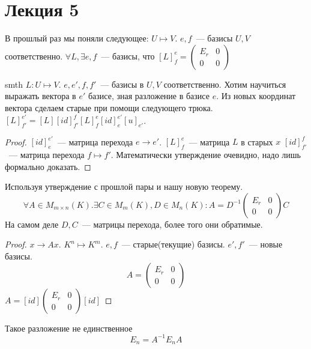 \section{Лекция 5}
В прошлый раз мы поняли следующее:
$U\mapsto V$.
$e,f$~--- базисы $U, V$ соответственно.
$\forall L, \exists e,f$~--- базисы,
что $[L]_f^e=
\begin{pmatrix}
    E_r & 0\\
    0 & 0
\end{pmatrix}$

\begin{theorem}{ smth }
    $L: U\mapsto V$. 
    $e, e', f, f'$~--- базисы в $U, V$ соответственно.
    Хотим научиться выражать вектора в $e'$ базисе, зная разложение
    в базисе $e$.
    Из новых координат вектора сделаем старые при помощи следующего трюка.
    $[L]^{e'}_{f'}=[L][id]_{f'}^{f}[L]_f^{e}[id]_e^{e'}[u]_{e'}$.
\end{theorem}
\begin{proof}
    $[id]_{e}^{e'}$~--- матрица перехода $e\rightarrow e'$.
    $[L]_f^e$~--- матрица $L$ в старых $x$
    $[id]_{f'}^f$~--- матрица перехода $f\mapsto f'$.
    Математически утверждение очевидно, надо лишь формально доказать.
\end{proof}
\begin{follow}
    Используя утверждение с прошлой пары и нашу новую теорему.
    $$\forall A\in M_{m\times n}(K).
    \exists C\in M_m(K), D\in M_n(K): A = D^{-1}
    \begin{pmatrix}
        E_r & 0\\
        0 & 0
    \end{pmatrix}C$$
    На самом деле $D, C$~--- матрицы перехода, более того они
    обратимые.
\end{follow}
\begin{proof}
    $x\rightarrow Ax$.
    $K^n\mapsto K^m$.
    $e, f$~--- старые(текущие) базисы.
    $e', f'$~--- новые базисы.
    $$A = \begin{pmatrix}
         E_r & 0\\
         0 & 0
        \end{pmatrix}
    $$
    $A = [id]\begin{pmatrix}
        E_r & 0\\
        0 & 0
    \end{pmatrix}[id]$
\end{proof}
\begin{remark}
    Такое разложение не единственное
    $$
    E_n = A^{-1}E_nA
    $$
\end{remark}
